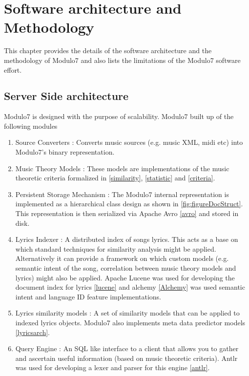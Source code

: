 \chapter{Software architecture and Methodology}
\noindent This chapter provides the details of the software architecture and the methodology of Modulo7 and also lists the limitations of the Modulo7 software effort. 
\section{Server Side architecture}
\noindent Modulo7 is designed with the purpose of scalability. Modulo7 built up of the following modules
\begin{enumerate}
\item Source Converters : Converts music sources (e.g. music XML, midi etc) into Modulo7's binary representation.
\item Music Theory Models : These models are implementations of the music  theoretic criteria formalized in \ref{similarity}, \ref{statistic} and \ref{criteria}.
\item Persistent Storage Mechanism : The Modulo7 internal representation is implemented as a hierarchical class design as shown in \ref{fig:figureDocStruct}. This representation is then serialized via Apache Avro \ref{avro} and stored in disk. 
\item Lyrics Indexer : A distributed index of songs lyrics. This acts as a base on which standard techniques for similarity analysis might be applied. Alternatively it can provide a framework on which custom models (e.g. semantic intent of the song, correlation between music theory models and lyrics) might also be applied. Apache Lucene was used for developing the document index for lyrics \ref{lucene} and alchemy \ref{Alchemy} was used semantic intent and language ID feature implementations.  
\item Lyrics similarity models : A set of similarity models that can be applied to indexed lyrics objects. Modulo7 also implements meta data predictor models \ref{lyricsarch}. 
\item Query Engine : An SQL like interface to a client that allows you to gather and ascertain useful information (based on music theoretic criteria). Antlr was used for developing a lexer and parser for this engine \ref{antlr}. 
\end{enumerate}

